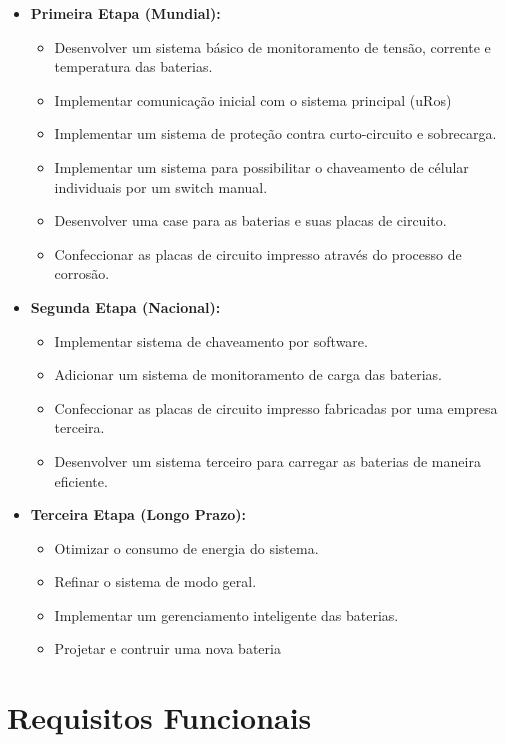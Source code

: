 \documentclass[12pt]{article}
\begin{document}
\begin{itemize}
    \item \textbf{Primeira Etapa (Mundial):}
    \begin{itemize}
        \item Desenvolver um sistema básico de monitoramento de tensão, corrente e temperatura das baterias.
        \item Implementar comunicação inicial com o sistema principal (uRos)
        \item Implementar um sistema de proteção contra curto-circuito e sobrecarga.
        \item Implementar um sistema para possibilitar o chaveamento de célular individuais por um switch manual.
        \item Desenvolver uma case para as baterias e suas placas de circuito.
        \item Confeccionar as placas de circuito impresso através do processo de corrosão.
    \end{itemize}
    \item \textbf{Segunda Etapa (Nacional):}
    \begin{itemize}
        \item Implementar sistema de chaveamento por software.
        \item Adicionar um sistema de monitoramento de carga das baterias.
        \item Confeccionar as placas de circuito impresso fabricadas por uma empresa terceira.
        \item Desenvolver um sistema terceiro para carregar as baterias de maneira eficiente.
    \end{itemize}
    \item \textbf{Terceira Etapa (Longo Prazo):}
    \begin{itemize}
        \item Otimizar o consumo de energia do sistema.
        \item Refinar o sistema de modo geral.
        \item Implementar um gerenciamento inteligente das baterias.
        \item Projetar e contruir uma nova bateria
    \end{itemize}

\end{itemize}

\section{Requisitos Funcionais}
\end{document}
